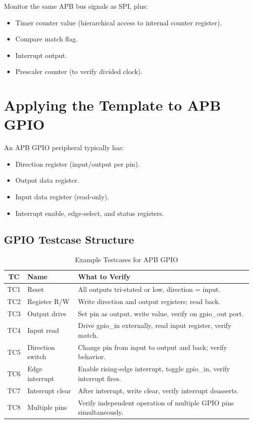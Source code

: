 Monitor the same APB bus signals as SPI, plus:
\begin{itemize}[leftmargin=2em]
  \item Timer counter value (hierarchical access to internal counter register).
  \item Compare match flag.
  \item Interrupt output.
  \item Prescaler counter (to verify divided clock).
\end{itemize}

\section{Applying the Template to APB GPIO}

An APB GPIO peripheral typically has:
\begin{itemize}[leftmargin=2em]
  \item Direction register (input/output per pin).
  \item Output data register.
  \item Input data register (read-only).
  \item Interrupt enable, edge-select, and status registers.
\end{itemize}

\subsection{GPIO Testcase Structure}

\begin{table}[H]
\centering
\caption{Example Testcases for APB GPIO}
\label{tab:gpio_tc}
\begin{tabularx}{\textwidth}{@{}clX@{}}
\toprule
\textbf{TC} & \textbf{Name} & \textbf{What to Verify} \\
\midrule
TC1 & Reset & All outputs tri-stated or low, direction = input. \\
TC2 & Register R/W & Write direction and output registers; read back. \\
TC3 & Output drive & Set pin as output, write value, verify on gpio\_out port. \\
TC4 & Input read & Drive gpio\_in externally, read input register, verify match. \\
TC5 & Direction switch & Change pin from input to output and back; verify behavior. \\
TC6 & Edge interrupt & Enable rising-edge interrupt, toggle gpio\_in, verify interrupt fires. \\
TC7 & Interrupt clear & After interrupt, write clear, verify interrupt deasserts. \\
TC8 & Multiple pins & Verify independent operation of multiple GPIO pins simultaneously. \\
\bottomrule
\end{tabularx}
\end{table}


